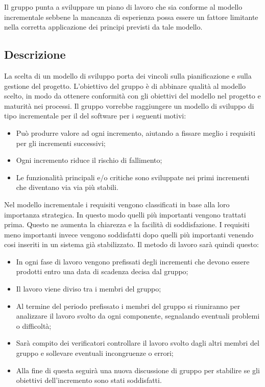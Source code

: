 Il gruppo \Gruppo{} punta a sviluppare un piano di lavoro che sia conforme al modello incrementale sebbene la mancanza di esperienza possa essere un fattore limitante nella corretta applicazione dei principi previsti da tale modello.

\subsection{Descrizione}
La scelta di un modello di sviluppo porta dei vincoli sulla pianificazione e sulla gestione del progetto.
L’obiettivo del gruppo è di abbinare qualità al modello scelto, in modo da ottenere conformità con
gli obiettivi del modello nel progetto e maturità nei processi.
Il gruppo vorrebbe raggiungere un modello di sviluppo di tipo incrementale per il  del software per i seguenti
motivi:
\begin{itemize}
    \item Può produrre valore ad ogni incremento, aiutando a fissare meglio i requisiti per gli incrementi
    successivi;
    \item Ogni incremento riduce il rischio di fallimento;
    \item Le funzionalità principali e/o critiche sono sviluppate nei primi incrementi che diventano via via più stabili.
\end{itemize}





Nel modello incrementale i requisiti vengono classificati in base alla loro importanza strategica. In
questo modo quelli più importanti vengono trattati prima. Questo ne aumenta la chiarezza e la
facilità di soddisfazione. I requisiti meno importanti invece vengono soddisfatti dopo quelli più
importanti venendo cosi inseriti in un sistema già stabilizzato.
Il metodo di lavoro sarà quindi questo:
\begin{itemize}
    \item In ogni fase di lavoro vengono prefissati degli incrementi che devono essere prodotti entro una data di
    scadenza decisa dal gruppo;
    \item Il lavoro viene diviso tra i membri del gruppo;
    \item Al termine del periodo prefissato i membri del gruppo si riuniranno per analizzare il lavoro svolto da ogni
    componente, segnalando eventuali problemi o difficoltà;
    \item Sarà compito dei verificatori controllare il lavoro svolto dagli altri membri del gruppo e sollevare
    eventuali incongruenze o errori;
    \item Alla fine di questa  seguirà una nuova discussione di gruppo per stabilire se gli obiettivi
    dell’incremento sono stati soddisfatti.
\end{itemize}






